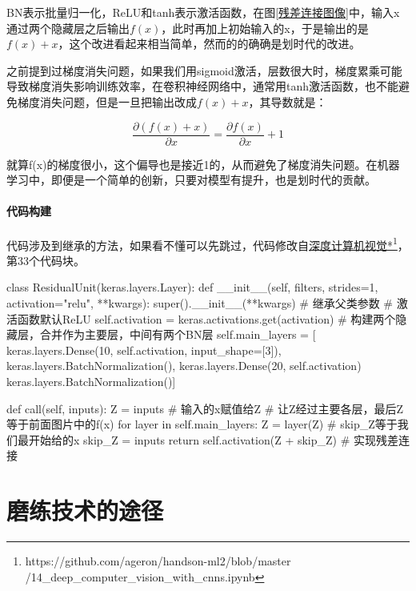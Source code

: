 \documentclass[a5paper, 11pt]{ctexbook}
\begin{document}
BN表示批量归一化，ReLU和tanh表示激活函数，在图\ref{残差连接图像}中，输入x通过两个隐藏层之后输出$f(x)$，此时再加上初始输入的x，于是输出的是$f(x)+x$，这个改进看起来相当简单，然而的的确确是划时代的改进。

之前提到过梯度消失问题，如果我们用sigmoid激活，层数很大时，梯度累乘可能导致梯度消失影响训练效率，在卷积神经网络中，通常用tanh激活函数，也不能避免梯度消失问题，但是一旦把输出改成$f(x)+x$，其导数就是：

\begin{equation}
    \frac{\partial{(f(x)+x)}}{\partial{x}} = \frac{\partial{f(x)}}{\partial{x}} + 1
\end{equation}

就算f(x)的梯度很小，这个偏导也是接近1的，从而避免了梯度消失问题。在机器学习中，即便是一个简单的创新，只要对模型有提升，也是划时代的贡献。

\subsubsection{代码构建}

代码涉及到继承的方法，如果看不懂可以先跳过，代码修改自\href{https://github.com/ageron/handson-ml2/blob/master/14_deep_computer_vision_with_cnns.ipynb}{深度计算机视觉*}\footnote{https://github.com/ageron/handson-ml2/blob/master\\/14\_deep\_computer\_vision\_with\_cnns.ipynb}，第33个代码块。

\begin{python}
    class ResidualUnit(keras.layers.Layer):
    def __init__(self, filters, strides=1,
    activation="relu", **kwargs):
    super().__init__(**kwargs) # 继承父类参数
    # 激活函数默认ReLU
    self.activation = keras.activations.get(activation)
    # 构建两个隐藏层，合并作为主要层，中间有两个BN层
    self.main_layers = [
    keras.layers.Dense(10, self.activation,
    input_shape=[3]),
    keras.layers.BatchNormalization(),
    keras.layers.Dense(20, self.activation)
    keras.layers.BatchNormalization()]

    def call(self, inputs):
    Z = inputs # 输入的x赋值给Z
    # 让Z经过主要各层，最后Z等于前面图片中的f(x)
    for layer in self.main_layers:
    Z = layer(Z)
    # skip_Z等于我们最开始给的x
    skip_Z = inputs
    return self.activation(Z + skip_Z) # 实现残差连接
\end{python}



\chapter{磨练技术的途径}
\end{document}
